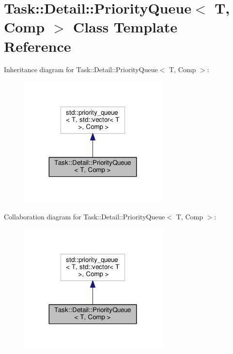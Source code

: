 \hypertarget{classTask_1_1Detail_1_1PriorityQueue}{}\section{Task\+:\+:Detail\+:\+:Priority\+Queue$<$ T, Comp $>$ Class Template Reference}
\label{classTask_1_1Detail_1_1PriorityQueue}


Inheritance diagram for Task\+:\+:Detail\+:\+:Priority\+Queue$<$ T, Comp $>$\+:
\nopagebreak
\begin{figure}[H]
\begin{center}
\leavevmode
\includegraphics[width=215pt]{classTask_1_1Detail_1_1PriorityQueue__inherit__graph}
\end{center}
\end{figure}


Collaboration diagram for Task\+:\+:Detail\+:\+:Priority\+Queue$<$ T, Comp $>$\+:
\nopagebreak
\begin{figure}[H]
\begin{center}
\leavevmode
\includegraphics[width=215pt]{classTask_1_1Detail_1_1PriorityQueue__coll__graph}
\end{center}
\end{figure}

